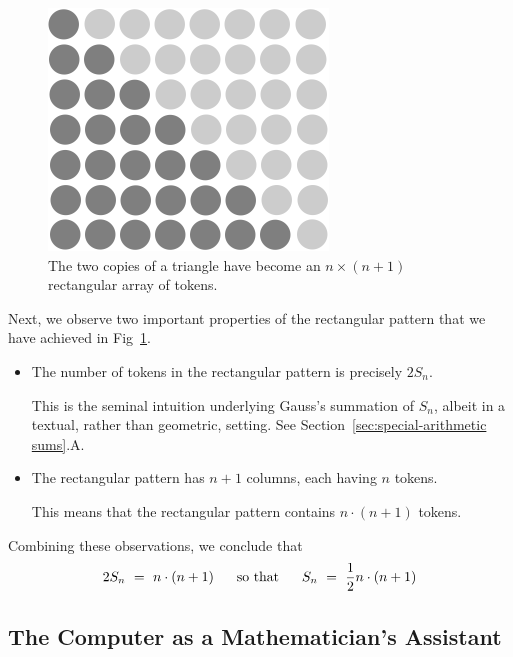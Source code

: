 \begin{figure}[ht]
\begin{center}
       \includegraphics[scale=0.35]{FiguresMaths/SumIntegersFinal}
\caption{The two copies of a triangle have become an $n \times (n+1)$
  rectangular array of tokens.}
       \label{fig:sumIntegers3}
\end{center}
\end{figure}
Next, we observe two important properties of the rectangular pattern
that we have achieved in Fig~\ref{fig:sumIntegers3}.
\begin{itemize}
\item
The number of tokens in the rectangular pattern is precisely $2 S_n$.

This is the seminal intuition underlying Gauss's summation of $S_n$,
albeit in a textual, rather than geometric, setting.  See
Section~\ref{sec:special-arithmetic sums}.A.

\item
The rectangular pattern has $n+1$ columns, each having $n$ tokens.

This means that the rectangular pattern contains $n \cdot (n+1)$
tokens.
\end{itemize}
Combining these observations, we conclude that
\[ 2 S_n \ = \ n \cdot (n+1) \ \ \ \ \mbox{ so that } \ \ \ \
S_n \ = \ {1 \over 2} n \cdot (n+1)
\]


\subsection{The Computer as a Mathematician's Assistant}

